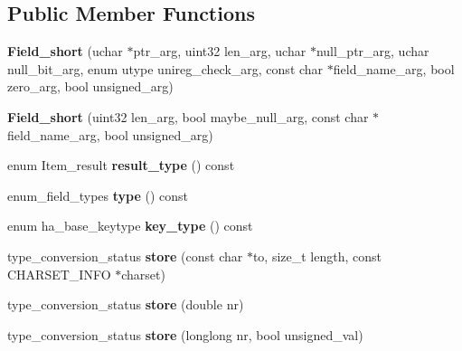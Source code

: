 \subsection*{Public Member Functions}
\begin{DoxyCompactItemize}
\item 
\mbox{\label{classField__short_a88f4886d169d3a20e7f7cd7c0fac92d8}} 
{\bfseries Field\+\_\+short} (uchar $\ast$ptr\+\_\+arg, uint32 len\+\_\+arg, uchar $\ast$null\+\_\+ptr\+\_\+arg, uchar null\+\_\+bit\+\_\+arg, enum utype unireg\+\_\+check\+\_\+arg, const char $\ast$field\+\_\+name\+\_\+arg, bool zero\+\_\+arg, bool unsigned\+\_\+arg)
\item 
\mbox{\label{classField__short_a5c33eb3d89ecaae3100ef31d23bb99f6}} 
{\bfseries Field\+\_\+short} (uint32 len\+\_\+arg, bool maybe\+\_\+null\+\_\+arg, const char $\ast$field\+\_\+name\+\_\+arg, bool unsigned\+\_\+arg)
\item 
\mbox{\label{classField__short_ae8cff5760c92899ee881ef2bb4ced006}} 
enum Item\+\_\+result {\bfseries result\+\_\+type} () const
\item 
\mbox{\label{classField__short_a63c04b0e712a4405709bd77a106d611a}} 
enum\+\_\+field\+\_\+types {\bfseries type} () const
\item 
\mbox{\label{classField__short_adf150104f3aa254f53b1ee915f90314d}} 
enum ha\+\_\+base\+\_\+keytype {\bfseries key\+\_\+type} () const
\item 
\mbox{\label{classField__short_a283267d2945471650ff28245c31ee328}} 
type\+\_\+conversion\+\_\+status {\bfseries store} (const char $\ast$to, size\+\_\+t length, const C\+H\+A\+R\+S\+E\+T\+\_\+\+I\+N\+FO $\ast$charset)
\item 
\mbox{\label{classField__short_acc0acd61fdf1b0f28df9055e88ef6430}} 
type\+\_\+conversion\+\_\+status {\bfseries store} (double nr)
\item 
\mbox{\label{classField__short_a8d26c6c42242df37bae94a2716aec802}} 
type\+\_\+conversion\+\_\+status {\bfseries store} (longlong nr, bool unsigned\+\_\+val)

\end{DoxyCompactItemize}
